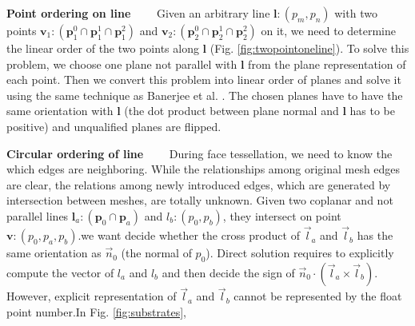 \documentclass[10pt,journal,compsoc]{IEEEtran}
\begin{document}
\vspace{0.5em}
\noindent \textbf{Point ordering on line}~~~~
Given an arbitrary line $\bm{l}\colon(p_m, p_n)$ with two points $\bm{v}_1\colon(\bm{p}_1^0\cap\bm{p}_1^1\cap\bm{p}_1^2)$ and $\bm{v}_2\colon(\bm{p}_2^0\cap\bm{p}_2^1\cap\bm{p}_2^2)$ on it, we need to determine the linear order of the two points along $\bm{l}$ (Fig. \ref{fig:twopointoneline}). To solve this problem, we choose one plane not parallel with $\bm{l}$ from the plane representation of each point. Then we convert this problem into linear order of planes and solve it using the same technique as Banerjee et al. \cite{banerjee1996topologically}. The chosen planes have to have the same orientation with $\bm{l}$ (the dot product between plane normal and $\bm{l}$ has to be positive) and unqualified planes are flipped.


\vspace{0.5em}
\noindent \textbf{Circular ordering of line}~~~~
During face tessellation, we need to know the which edges are neighboring. While the relationships among original mesh edges are clear, the relations among newly introduced edges, which are generated by intersection between meshes, are totally unknown. Given two coplanar and not parallel lines $\bm{l}_a\colon(\bm{p}_0\cap\bm{p}_a)$ and $l_b\colon(p_0, p_b)$, they intersect on point $\bm{v}\colon(p_0,p_a,p_b)$.we want decide whether the cross product of $\vec{l}_a$ and $\vec{l}_b$ has the same orientation as $\vec{n}_0$ (the normal of $p_0$). Direct solution requires to explicitly compute the vector of $l_a$ and $l_b$ and then decide the sign of $\vec{n}_0 \cdot (\vec{l}_a \times \vec{l}_b)$. However, explicit representation of $\vec{l}_a$ and $\vec{l}_b$ cannot be represented by the float point number.In Fig. \ref{fig:substrates}, 
\end{document}
